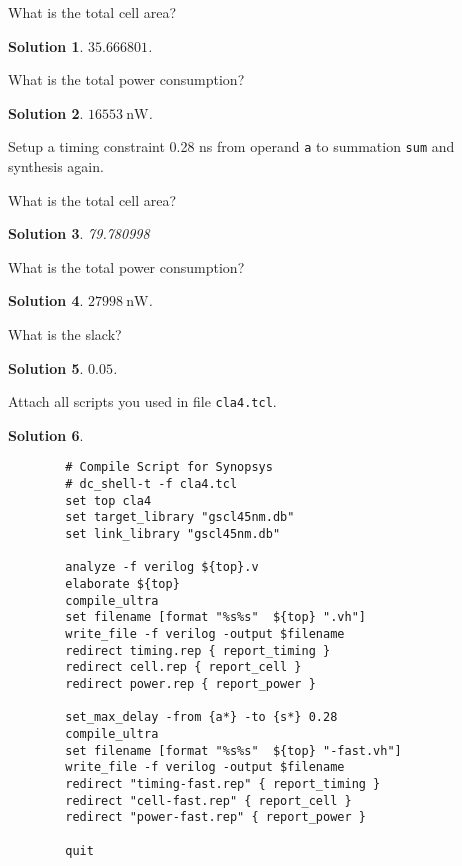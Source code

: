 \documentclass[acmlarge,screen=true,anonymous=false,11pt]{acmart}
\newtheorem*{solution*}{Solution}
\begin{document}
\begin{example}
    What is the total cell area?
\end{example}
\begin{solution*}
    $35.666801$.
\end{solution*}
\begin{example}
    What is the total power consumption?
\end{example}
\begin{solution*}
    $16553~\mathrm{nW}$.
\end{solution*}

Setup a timing constraint 0.28 ns from operand \texttt{a} to summation \texttt{sum} and synthesis again.

\begin{example}
    What is the total cell area?
\end{example}
\begin{solution*}
    79.780998
\end{solution*}
\begin{example}
    What is the total power consumption?
\end{example}
\begin{solution*}
    $27998~\mathrm{nW}$.
\end{solution*}
\begin{example}
    What is the slack?
\end{example}
\begin{solution*}
    $0.05$.
\end{solution*}
\begin{example}
    Attach all scripts you used in file \texttt{cla4.tcl}.
\end{example}
\begin{solution*}
    \lstset{language=tcl,
        basicstyle=\ttfamily\scriptsize
    }
    \begin{lstlisting}
        # Compile Script for Synopsys
        # dc_shell-t -f cla4.tcl
        set top cla4
        set target_library "gscl45nm.db"
        set link_library "gscl45nm.db"
        
        analyze -f verilog ${top}.v
        elaborate ${top}
        compile_ultra
        set filename [format "%s%s"  ${top} ".vh"]
        write_file -f verilog -output $filename
        redirect timing.rep { report_timing }
        redirect cell.rep { report_cell }
        redirect power.rep { report_power }
        
        set_max_delay -from {a*} -to {s*} 0.28
        compile_ultra
        set filename [format "%s%s"  ${top} "-fast.vh"]
        write_file -f verilog -output $filename
        redirect "timing-fast.rep" { report_timing }
        redirect "cell-fast.rep" { report_cell }
        redirect "power-fast.rep" { report_power }
        
        quit
    \end{lstlisting}
\end{solution*}
\end{document}
